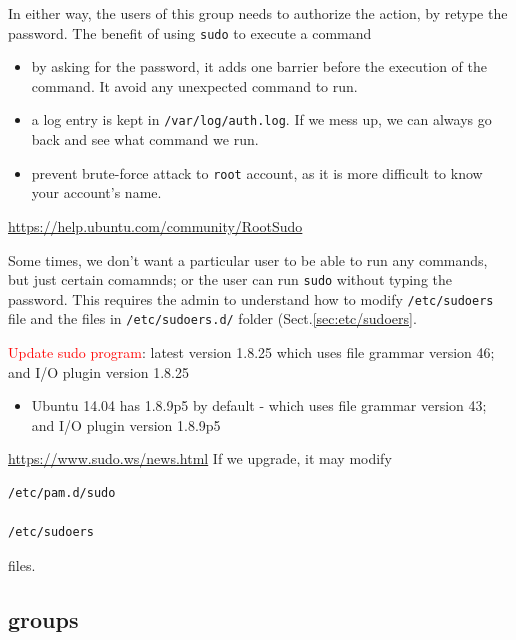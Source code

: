 In either way, the users of this group needs to authorize the action, by retype
the password. The benefit of using \verb!sudo! to execute a command
\begin{itemize}
  \item by asking for the password, it adds one barrier before the execution of
  the command. It avoid any unexpected command to run.
  
  \item a log entry is kept in \verb!/var/log/auth.log!. If we mess up, we can
  always go back and see what command we run.
  
  \item prevent brute-force attack to \verb!root! account, as it is more
  difficult to know your account's name.
\end{itemize}
\url{https://help.ubuntu.com/community/RootSudo}

Some times, we don't want a particular user to be able to run any commands, but
just certain comamnds; or the user can run \verb!sudo! without typing the
password. This requires the admin to understand how to modify
\verb!/etc/sudoers! file and the files in \verb!/etc/sudoers.d/! folder
(Sect.\ref{sec:etc/sudoers}.


\textcolor{red}{Update sudo program}:  latest version 1.8.25 which uses file grammar version 46; and I/O plugin version 1.8.25
\begin{itemize}
  \item Ubuntu 14.04 has 1.8.9p5 by default - which uses file grammar version 43; and I/O plugin version 1.8.9p5
\end{itemize}
\url{https://www.sudo.ws/news.html}
If we upgrade, it may modify
\begin{verbatim}
/etc/pam.d/sudo

/etc/sudoers   
\end{verbatim}
files. 

\subsection{groups}
\label{sec:groups}

